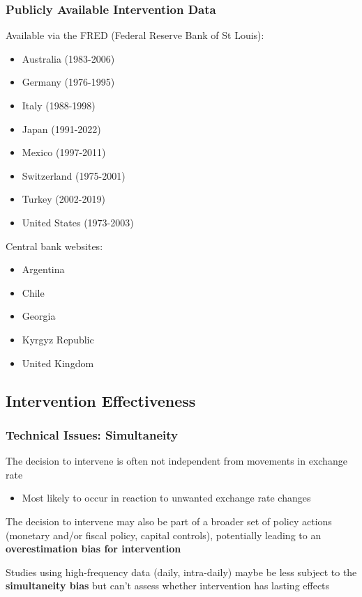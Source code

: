 \documentclass{beamer}
\newenvironment{wideitemize}{\itemize\addtolength{\itemsep}{10pt}}{\enditemize}
\begin{document}
\begin{frame}
  \frametitle{Publicly Available Intervention Data}
  Available via the FRED (Federal Reserve Bank of St Louis):

  \begin{itemize}
  \item Australia (1983-2006)
  \item Germany (1976-1995)
  \item Italy (1988-1998)
  \item Japan (1991-2022)
  \item Mexico (1997-2011)
  \item Switzerland (1975-2001)
  \item Turkey (2002-2019)
  \item United States (1973-2003)
  \end{itemize}

  Central bank websites:
  \begin{itemize}
  \item Argentina
  \item Chile
  \item Georgia
  \item Kyrgyz Republic
  \item United Kingdom
  \end{itemize}  
\end{frame}

\subsection{Intervention Effectiveness}

\begin{frame}
  \frametitle{Technical Issues: Simultaneity}

  \begin{wideitemize}
  \item The decision to intervene is often not independent from movements in exchange rate
    \begin{itemize}
    \item Most likely to occur in reaction to unwanted exchange rate changes
    \end{itemize}
    \item The decision to intervene may also be part of a broader set of policy actions (monetary and/or fiscal policy, capital controls), potentially leading to an \textbf{overestimation bias for intervention}
    \item Studies using high-frequency data (daily, intra-daily) maybe be less subject to the \textbf{simultaneity bias} but can't assess whether intervention has lasting effects
  \end{wideitemize}  
\end{frame}
\end{document}
